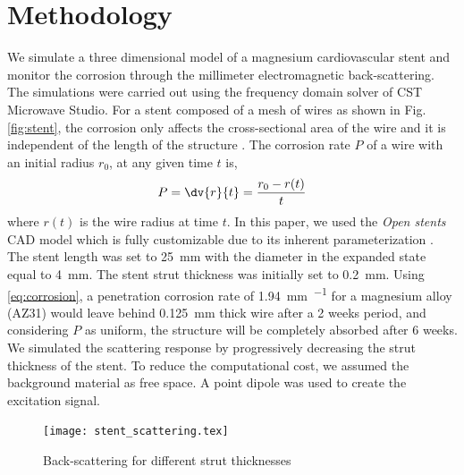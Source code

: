 \documentclass[conference,a4paper]{IEEEtran}
\begin{document}
\section{Methodology}
%
We simulate a three dimensional model of a magnesium cardiovascular stent and monitor the corrosion through the millimeter electromagnetic back-scattering. The simulations were carried out using the frequency domain solver of CST Microwave Studio.  For a stent composed of a mesh of wires as shown in Fig. \ref{fig:stent}, the corrosion only affects the cross-sectional area of the wire and it is independent of the length of the structure \cite{bowen2015rates}. The corrosion rate $P$ of a wire with an initial radius $r_0$, at any given time $t$ is,
\begin{equation}
  P = \dv{r}{t} = \frac{r_0 - r(t)}{t}
  \label{eq:corrosion}
\end{equation}
%
where $r(t)$ is the wire radius at time $t$.
%
In this paper, we used the \emph{Open stents} CAD model which is fully customizable due to its inherent parameterization \cite{bonsignore_open_2012}. The stent length was set to \SI{25}{\mm} with the diameter in the expanded state equal to \SI{4}{\mm}. The stent strut thickness was initially set to \SI{.2}{\mm}. Using \eqref{eq:corrosion}, a penetration corrosion rate of \SI{1.94}{\mm \per \year} for a magnesium alloy (AZ31) \cite{YU2017330} would leave behind \SI{.125}{\mm} thick wire after a \num{2} weeks period, and considering $P$ as uniform, the structure will be completely absorbed after \num{6} weeks.
%
We simulated the scattering response by progressively decreasing the strut thickness of the stent. To reduce the computational cost, we assumed the background material as free space. A point dipole was used to create the excitation signal.
%
\begin{figure}[h!]
  \centering
  \texttt{[image: stent\_scattering.tex]}
  \caption{Back-scattering for different strut thicknesses}
  \label{fig:bcs}
\end{figure}
%
%
%
\vspace{7pt}
\end{document}
